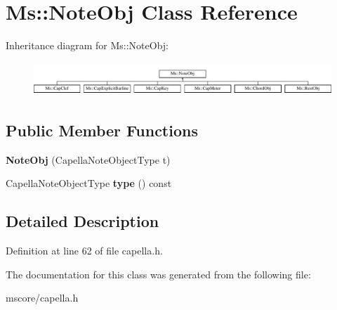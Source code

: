 \hypertarget{class_ms_1_1_note_obj}{}\section{Ms\+:\+:Note\+Obj Class Reference}
\label{class_ms_1_1_note_obj}
Inheritance diagram for Ms\+:\+:Note\+Obj\+:\begin{figure}[H]
\begin{center}
\leavevmode
\includegraphics[height=1.278539cm]{class_ms_1_1_note_obj}
\end{center}
\end{figure}
\subsection*{Public Member Functions}
\begin{DoxyCompactItemize}
\item 
\mbox{\label{class_ms_1_1_note_obj_a50e750209c82a63077e56446caf443d0}} 
{\bfseries Note\+Obj} (Capella\+Note\+Object\+Type t)
\item 
\mbox{\label{class_ms_1_1_note_obj_ade0985ce7d6696ee759cbda7fc2c2ab9}} 
Capella\+Note\+Object\+Type {\bfseries type} () const
\end{DoxyCompactItemize}


\subsection{Detailed Description}


Definition at line 62 of file capella.\+h.



The documentation for this class was generated from the following file\+:\begin{DoxyCompactItemize}
\item 
mscore/capella.\+h\end{DoxyCompactItemize}

